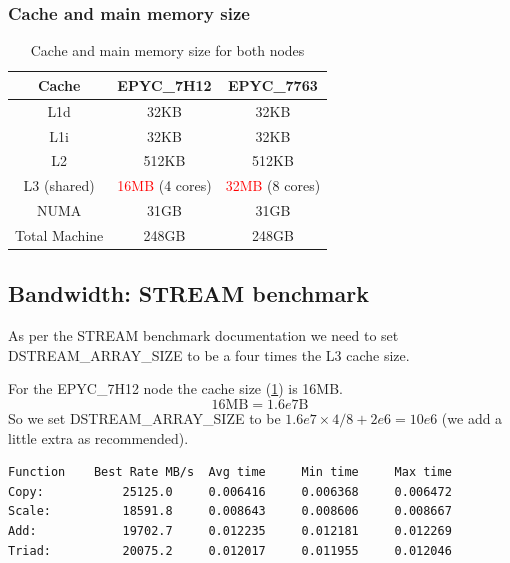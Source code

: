 \documentclass[unicode,11pt,a4paper,oneside,numbers=endperiod,openany]{scrartcl}
\begin{document}
\subsubsection{Cache and main memory size}


\begin{table}[h]
    \centering
    \begin{tabular}{|c|c|c|}
        \hline

        \textbf{Cache} & \textbf{EPYC\_7H12}             & \textbf{EPYC\_7763}             \\
        \hline
        L1d            & 32KB                            & 32KB                            \\
        \hline
        L1i            & 32KB                            & 32KB                            \\
        \hline
        L2             & 512KB                           & 512KB                           \\
        \hline
        L3 (shared)    & \textcolor{red}{16MB} (4 cores) & \textcolor{red}{32MB} (8 cores) \\
        \hline
        NUMA           & 31GB                            & 31GB                            \\
        \hline
        Total Machine  & 248GB                           & 248GB                           \\
        \hline
    \end{tabular}
    \caption{Cache and main memory size for both nodes}
    \label{tab:cache_main_memory}
\end{table}


\subsection{Bandwidth: STREAM benchmark}

As per the STREAM benchmark documentation we need to set DSTREAM\_ARRAY\_SIZE to be a four times the L3 cache size.

For the EPYC\_7H12 node the cache size (\ref{tab:cache_main_memory}) is 16MB. $$16\text{MB} = 1.6e7\text{B}$$ So we set DSTREAM\_ARRAY\_SIZE to be $1.6e7 \times 4 / 8 + 2e6 = 10e6$ (we add a little extra as recommended).

\begin{lstlisting}
Function    Best Rate MB/s  Avg time     Min time     Max time
Copy:           25125.0     0.006416     0.006368     0.006472
Scale:          18591.8     0.008643     0.008606     0.008667
Add:            19702.7     0.012235     0.012181     0.012269
Triad:          20075.2     0.012017     0.011955     0.012046
\end{lstlisting}
\end{document}
